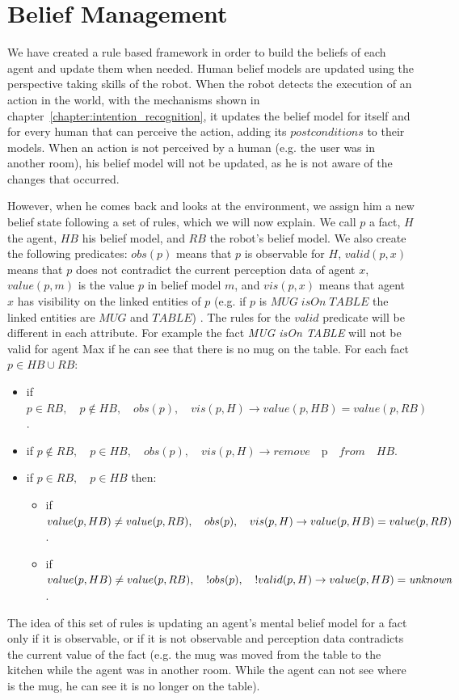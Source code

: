\section{Belief Management}
\label{sec:belief_management-belief_management}
We have created a rule based framework in order to build the beliefs of each agent and update them when needed. Human belief models are updated using the perspective taking skills of the robot. When the robot detects the execution of an action in the world, with the mechanisms shown in chapter~\ref{chapter:intention_recognition},
it updates the belief model for itself and for every human that can perceive the action, adding its $postconditions$ to their models. When an action is not perceived by a human (e.g. the user was in another room), his belief model will not be updated, as he is not aware of the changes that occurred.

However, when he comes back and looks at the environment, we assign him a new belief state following a set of rules, which we will now explain. We call $p$ a fact, $H$ the agent, $HB$ his belief model, and $RB$ the robot's belief model. We also create the following predicates: $obs(p)$ means that $p$ is observable for $H$, $valid(p,x)$ means that $p$ does not contradict the current perception data of agent $x$, $value(p,m)$ is the value $p$ in belief model $m$, and $vis(p,x)$ means that agent $x$ has visibility on the linked entities of $p$ (e.g. if $p$ is $MUG\; isOn \; TABLE$ the linked entities are $MUG$ and $TABLE$) . The rules for the $valid$ predicate will be different in each attribute. For example the fact \textit{MUG isOn TABLE} will not be valid for agent Max if he can see that there is no mug on the table. For each fact $p\in HB \cup RB$:
\begin{itemize}
\item if $p \in RB, \quad p\not\in HB,\quad obs(p),\quad vis(p,H) \rightarrow value(p,HB)=value(p,RB)$.
\item if $p \not \in RB,\quad p\in HB,\quad obs(p),\quad vis(p,H) \rightarrow remove\quad $p$ \quad from \quad HB$.
\item if $p\in RB,\quad p\in HB$ then:
	\begin{itemize}
      \item if $value(p,HB)\neq value(p,RB),\\ \quad obs(p),\quad vis(p,H) \rightarrow \\ value(p,HB)=value(p,RB)$.
      \item if $value(p,HB)\neq value(p,RB),\\ \quad !obs(p),\quad !valid(p,H) \rightarrow \\ value(p,HB)=\textit{unknown}$.
	\end{itemize}
\end{itemize}
The idea of this set of rules is updating an agent's mental belief model for a fact only if it is observable, or if it is not observable and perception data contradicts the current value of the fact (e.g. the mug was moved from the table to the kitchen while the agent was in another room. While the agent can not see where is the mug, he can see it is no longer on the table).



